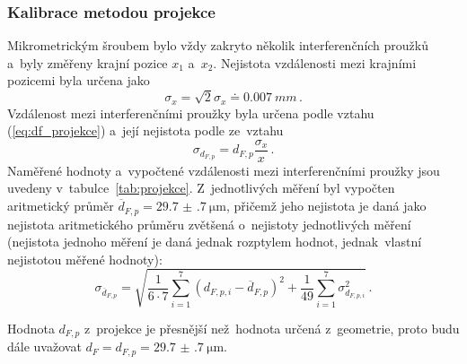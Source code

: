 \documentclass{../concepts/titul_zprava_p/prepareprotokolZprava} %
\newcommand{\relative}[1]{
\frac{\sigma_{#1}}{#1}
}
\begin{document}
\subsubsection{Kalibrace metodou projekce}

Mikrometrickým šroubem bylo vždy zakryto několik interferenčních proužků a~byly změřeny krajní pozice $x_1$ a~$x_2$.
Nejistota vzdálenosti mezi krajními pozicemi byla určena jako
\begin{equation}
    \label{eq:sigma_x}
    \sigma_x = \sqrt{2} \sigma_x \doteq \qty{0.007}{mm} \,.
\end{equation}
Vzdálenost mezi interferenčními proužky byla určena podle vztahu (\ref{eq:df_projekce}) a~její nejistota podle \cite{englich}
ze~vztahu
\begin{equation}
    \label{eq:sigma_df_projekce}
    \sigma_{d_{F,p}} = d_{F,p} \relative{x} \,.
\end{equation}
Naměřené hodnoty a~vypočtené vzdálenosti mezi interferenčními proužky jsou uvedeny v~tabulce~\ref{tab:projekce}.
Z~jednotlivých měření byl vypočten aritmetický průměr $\overline{d}_{F,p} = \qty{29.7(7)}{\micro \meter}$, přičemž jeho
nejistota je daná \cite{englich} jako nejistota aritmetického průměru zvětšená o~nejistoty jednotlivých měření
(nejistota jednoho měření je daná jednak rozptylem hodnot, jednak~vlastní nejistotou měřené hodnoty):
\begin{equation}
    \label{eq:sigma_mean_df_projekce}
    \sigma_{\overline{d}_{F,p}} = \sqrt{ \frac{1}{6 \cdot 7} \sum_{i=1}^{7} \left( d_{F,p,i} - \overline{d}_{F,p} \right)^2
    + \frac{1}{49} \sum_{i=1}^{7} \sigma_{d_{F,p,i}}^2 } \,.
\end{equation}

Hodnota $d_{F,p}$ z~projekce je přesnější než~hodnota určená z~geometrie, proto budu dále uvažovat 
$d_F = d_{F,p} = \qty{29.7(7)}{\micro \meter}$.
\end{document}
